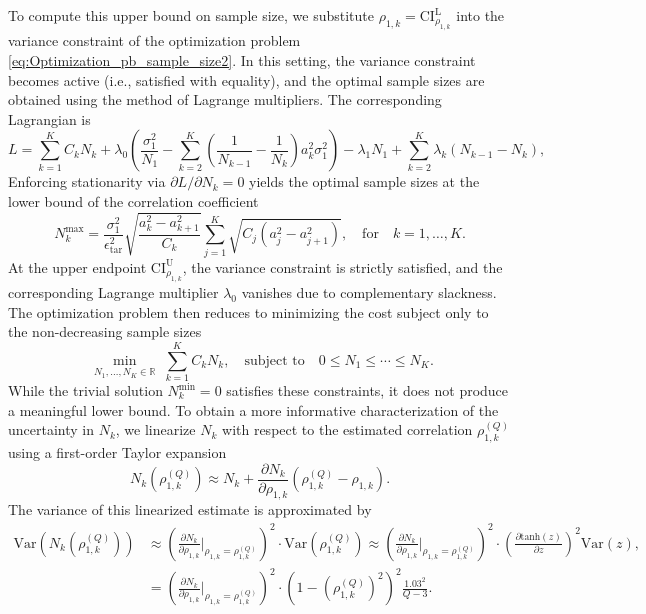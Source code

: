 To compute this upper bound on sample size, we substitute $\rho_{1,k} = \text{CI}_{\rho_{1,k}}^{\text{L}}$ into the variance constraint of the optimization problem \eqref{eq:Optimization_pb_sample_size2}. In this setting, the variance constraint becomes active (i.e., satisfied with equality), and the optimal sample sizes are obtained using the method of Lagrange multipliers. The corresponding Lagrangian is
%
\[
L = \sum_{k=1}^K C_kN_k +\lambda_0 \left(\frac{\sigma_1^2}{N_1} - \sum_{k=2}^K \left(\frac{1}{N_{k-1}} - \frac{1}{N_k}\right)a_k^2\sigma_1^2\right)-\lambda_1 N_1+\sum_{k=2}^K\lambda_k(N_{k-1} - N_k),
\]
%
Enforcing stationarity via $\partial L / \partial N_k = 0$ yields the optimal sample sizes at the lower bound of the correlation coefficient
%
\[
N_k^{\text{max}} = \frac{\sigma_1^2}{\epsilon_{\text{tar}}^2}\sqrt{\frac{a_{k}^2-a_{k+1}^2}{C_k}}\sum_{j=1}^K\sqrt{C_j\left(a_{j}^2-a_{j+1}^2\right)},\quad \text{for}\quad  k=1,\ldots,K.
\]
%
At the upper endpoint $\text{CI}_{\rho_{1,k}}^{\text{U}}$, the variance constraint is strictly satisfied, and the corresponding Lagrange multiplier $\lambda_0$ vanishes due to complementary slackness. The optimization problem then reduces to minimizing the cost subject only to the non-decreasing sample sizes
%
\[
\min \limits_{\begin{array}{c}\scriptstyle N_1,\ldots, N_K\in \mathbb{R}\end{array}}\sum\limits_{k=1}^K C_kN_k, \quad \text{subject to} \quad  0\le N_1\le \cdots \le N_K.
\]
%
While the trivial solution $N_k^{\text{min}} = 0$ satisfies these constraints, it does not produce a meaningful lower bound. To obtain a more informative characterization of the uncertainty in $N_k$, we linearize $N_k$ with respect to the estimated correlation $\rho_{1,k}^{(Q)}$ using a first-order Taylor expansion
%
\[
 N_k\left(\rho_{1,k}^{(Q)}\right)\approx N_k+ \frac{\partial N_k}{\partial \rho_{1,k}} \left( \rho_{1,k}^{(Q)}-\rho_{1,k}\right).
\]
%
The variance of this linearized estimate is approximated by
%
\begin{align*}
    \text{Var}\left(N_k\left(\rho_{1,k}^{(Q)}\right)\right) &\approx \left(\frac{\partial N_k}{\partial \rho_{1,k}}\Bigg |_{\rho_{1,k} = \rho_{1,k}^{(Q)}} \right)^2 \cdot \text{Var}\left(\rho_{1,k}^{(Q)}\right) \approx \left(\frac{\partial N_k}{\partial \rho_{1,k}}\Bigg |_{\rho_{1,k} = \rho_{1,k}^{(Q)}} \right)^2 \cdot \left(\frac{\partial \text{tanh}(z)}{\partial z}\right)^2\text{Var}(z),\\
    &= \left(\frac{\partial N_k}{\partial \rho_{1,k}}\Bigg |_{\rho_{1,k} = \rho_{1,k}^{(Q)}} \right)^2 \cdot \left(1-\left(\rho_{1,k}^{(Q)}\right)^2\right)^2\frac{1.03^2}{Q-3}.
\end{align*}
